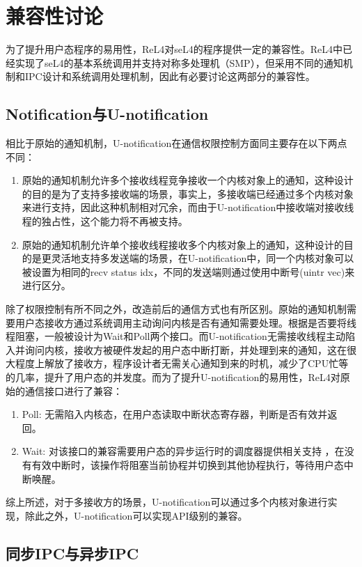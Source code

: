 \section{兼容性讨论}
为了提升用户态程序的易用性，ReL4对seL4的程序提供一定的兼容性。ReL4中已经实现了seL4的基本系统调用并支持对称多处理机（SMP），但采用不同的通知机制和IPC设计和系统调用处理机制，因此有必要讨论这两部分的兼容性。

\subsection{Notification与U-notification}

相比于原始的通知机制，U-notification在通信权限控制方面同主要存在以下两点不同：

\begin{enumerate}
  \item 原始的通知机制允许多个接收线程竞争接收一个内核对象上的通知，这种设计的目的是为了支持多接收端的场景，事实上，多接收端已经通过多个内核对象来进行支持，因此这种机制相对冗余，而由于U-notification中接收端对接收线程的独占性，这个能力将不再被支持。
  \item 原始的通知机制允许单个接收线程接收多个内核对象上的通知，这种设计的目的是更灵活地支持多发送端的场景，在U-notification中，同一个内核对象可以被设置为相同的recv status idx，不同的发送端则通过使用中断号(uintr vec)来进行区分。
\end{enumerate}

除了权限控制有所不同之外，改造前后的通信方式也有所区别。原始的通知机制需要用户态接收方通过系统调用主动询问内核是否有通知需要处理。根据是否要将线程阻塞，一般被设计为Wait和Poll两个接口。而U-notification无需接收线程主动陷入并询问内核，接收方被硬件发起的用户态中断打断，并处理到来的通知，这在很大程度上解放了接收方，程序设计者无需关心通知到来的时机，减少了CPU忙等的几率，提升了用户态的并发度。而为了提升U-notification的易用性，ReL4对原始的通信接口进行了兼容：
\begin{enumerate}
  \item Poll: 无需陷入内核态，在用户态读取中断状态寄存器，判断是否有效并返回。
  \item Wait: 对该接口的兼容需要用户态的异步运行时的调度器提供相关支持	，在没有有效中断时，该操作将阻塞当前协程并切换到其他协程执行，等待用户态中断唤醒。
\end{enumerate}

综上所述，对于多接收方的场景，U-notification可以通过多个内核对象进行实现，除此之外，U-notification可以实现API级别的兼容。

\subsection{同步IPC与异步IPC}

